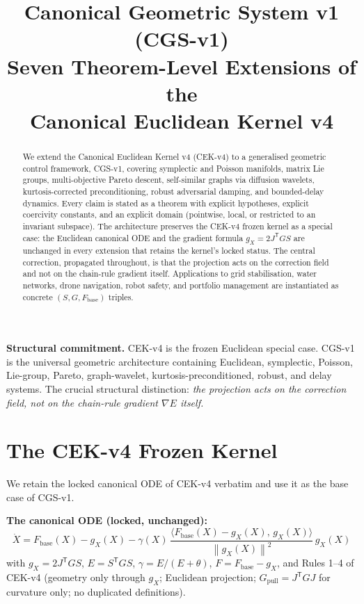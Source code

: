 \documentclass[11pt,a4paper]{article}
\title{\textbf{Canonical Geometric System v1 (CGS-v1)}\\[0.3em]
\large Seven Theorem-Level Extensions of the\\
Canonical Euclidean Kernel v4}
\author{}
\date{}
\theoremstyle{definition}
\newcommand{\Fbase}{F_{\mathrm{base}}}
\newcommand{\gX}{g_X}
\newcommand{\Gpull}{G_{\mathrm{pull}}}
\newcommand{\T}{^{\mathsf{T}}}
\newcommand{\norm}[1]{\left\|#1\right\|}
\newcommand{\inner}[2]{\langle #1,\,#2\rangle}
\begin{document}
\maketitle
\vspace{-2em}

\begin{abstract}
\noindent We extend the Canonical Euclidean Kernel v4 (CEK-v4) to a generalised geometric control framework, CGS-v1, covering symplectic and Poisson manifolds, matrix Lie groups, multi-objective Pareto descent, self-similar graphs via diffusion wavelets, kurtosis-corrected preconditioning, robust adversarial damping, and bounded-delay dynamics. Every claim is stated as a theorem with explicit hypotheses, explicit coercivity constants, and an explicit domain (pointwise, local, or restricted to an invariant subspace). The architecture preserves the CEK-v4 frozen kernel as a special case: the Euclidean canonical ODE and the gradient formula $\gX = 2J\T G S$ are unchanged in every extension that retains the kernel's locked status. The central correction, propagated throughout, is that the projection acts on the correction field and not on the chain-rule gradient itself. Applications to grid stabilisation, water networks, drone navigation, robot safety, and portfolio management are instantiated as concrete $(S, G, \Fbase)$ triples.
\end{abstract}

\vspace{0.5em}

\begin{lockedbox}
\textbf{Structural commitment.} CEK-v4 is the frozen Euclidean special case. CGS-v1 is the universal geometric architecture containing Euclidean, symplectic, Poisson, Lie-group, Pareto, graph-wavelet, kurtosis-preconditioned, robust, and delay systems. The crucial structural distinction: \emph{the projection acts on the correction field, not on the chain-rule gradient $\nabla E$ itself.}
\end{lockedbox}

\tableofcontents
\newpage

\section{The CEK-v4 Frozen Kernel}

We retain the locked canonical ODE of CEK-v4 verbatim and use it as the base case of CGS-v1.

\begin{lockedbox}
\textbf{The canonical ODE (locked, unchanged):}
\[
\dot X = \Fbase(X) - \gX(X) - \gamma(X)\,\frac{\inner{\Fbase(X)-\gX(X)}{\gX(X)}}{\norm{\gX(X)}^2}\,\gX(X)
\]
with $\gX = 2J\T G S$, $E = S\T G S$, $\gamma = E/(E+\theta)$, $F = \Fbase - \gX$, and Rules 1--4 of CEK-v4 (geometry only through $\gX$; Euclidean projection; $\Gpull = J\T G J$ for curvature only; no duplicated definitions).
\end{lockedbox}
\end{document}
